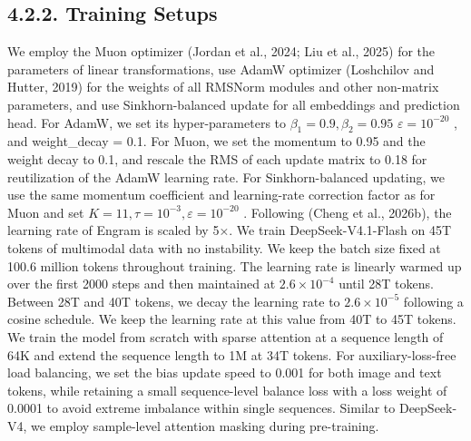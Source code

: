 \documentclass[
  10
]{article}
\begin{document}
\subsection{4.2.2. Training Setups}\label{training-setups}

We employ the Muon optimizer (Jordan et al., 2024; Liu et al., 2025) for
the parameters of linear transformations, use AdamW optimizer
(Loshchilov and Hutter, 2019) for the weights of all RMSNorm modules and
other non-matrix parameters, and use Sinkhorn-balanced update for all
embeddings and prediction head. For AdamW, we set its hyper-parameters
to \(\beta _ { 1 } = 0 . 9 , \beta _ { 2 } = 0 . 9 5\)
\(\varepsilon = 1 0 ^ { - 2 0 }\) , and weight\_decay = 0.1. For Muon,
we set the momentum to 0.95 and the weight decay to 0.1, and rescale the
RMS of each update matrix to 0.18 for reutilization of the AdamW
learning rate. For Sinkhorn-balanced updating, we use the same momentum
coefficient and learning-rate correction factor as for Muon and set
\(K = 1 1 , \tau = 1 0 ^ { - 3 } , \varepsilon = 1 0 ^ { - 2 0 }\) .
Following (Cheng et al., 2026b), the learning rate of Engram is scaled
by 5×. We train DeepSeek-V4.1-Flash on 45T tokens of multimodal data
with no instability. We keep the batch size fixed at 100.6 million
tokens throughout training. The learning rate is linearly warmed up over
the first 2000 steps and then maintained at
\(2 . 6 \times 1 0 ^ { - 4 }\) until 28T tokens. Between 28T and 40T
tokens, we decay the learning rate to \(2 . 6 \times 1 0 ^ { - 5 }\)
following a cosine schedule. We keep the learning rate at this value
from 40T to 45T tokens. We train the model from scratch with sparse
attention at a sequence length of 64K and extend the sequence length to
1M at 34T tokens. For auxiliary-loss-free load balancing, we set the
bias update speed to 0.001 for both image and text tokens, while
retaining a small sequence-level balance loss with a loss weight of
0.0001 to avoid extreme imbalance within single sequences. Similar to
DeepSeek-V4, we employ sample-level attention masking during
pre-training.
\end{document}
